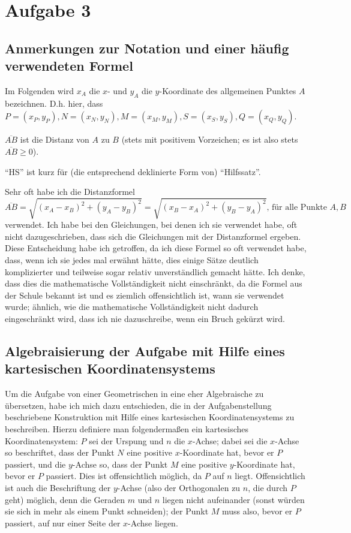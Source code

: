 \section{Aufgabe 3}

\subsection*{Anmerkungen zur Notation und einer häufig verwendeten Formel}

Im Folgenden wird $x_A$ die $x$- und $y_A$ die $y$-Koordinate des allgemeinen Punktes $A$ bezeichnen. D.h. hier, dass 
$P=(x_P, y_P), N=(x_N, y_N), M=(x_M, y_M), S=(x_S, y_S), Q=(x_Q, y_Q)$.

$\overline{AB}$ ist die Distanz von $A$ zu $B$ (stets mit positivem Vorzeichen; es ist also stets $\overline{AB}
\geq 0$).

"`HS"' ist kurz für (die entsprechend deklinierte Form von) "`Hilfssatz"'.

Sehr oft habe ich die Distanzformel 
\[\overline{AB}=\sqrt{(x_A-x_B)^2+(y_A-y_B)^2}=\sqrt{(x_B-x_A)^2+(y_B-y_A)^2}\text{, für alle Punkte $A,B$}\] 
verwendet. Ich habe bei den Gleichungen, bei denen ich sie verwendet habe, oft nicht dazugeschrieben, dass sich die 
Gleichungen mit der Distanzformel ergeben. Diese Entscheidung habe ich getroffen, da ich diese Formel so oft verwendet 
habe, dass, wenn ich sie jedes mal erwähnt hätte, dies einige Sätze deutlich komplizierter und teilweise sogar 
relativ unverständlich gemacht hätte. Ich denke, dass dies die mathematische Vollständigkeit nicht einschränkt, da 
die Formel aus der Schule bekannt ist und es ziemlich offensichtlich ist, wann sie verwendet wurde; ähnlich, wie 
die mathematische Vollständigkeit nicht dadurch eingeschränkt wird, dass ich nie dazuschreibe, wenn ein Bruch 
gekürzt wird.

\subsection*{Algebraisierung der Aufgabe mit Hilfe eines kartesischen Koordinatensystems}

Um die Aufgabe von einer Geometrischen in eine eher Algebraische zu übersetzen, habe ich mich dazu entschieden, die 
in der Aufgabenstellung beschriebene Konstruktion mit Hilfe eines kartesischen Koordinatensystems zu beschreiben. 
Hierzu definiere man folgendermaßen ein kartesisches Koordinatensystem: $P$ sei der Urspung und $n$ die $x$-Achse; 
dabei sei die $x$-Achse so beschriftet, dass der Punkt $N$ eine positive $x$-Koordinate hat, bevor er $P$ passiert, 
und die $y$-Achse so, dass der Punkt $M$ eine positive $y$-Koordinate hat, bevor er $P$ passiert. Dies ist 
offensichtlich möglich, da $P$ auf $n$ liegt. Offensichtlich ist auch die Beschriftung der $y$-Achse (also der 
Orthogonalen zu $n$, die durch $P$ geht) möglich, denn die Geraden $m$ und $n$ liegen nicht aufeinander (sonst 
würden sie sich in mehr als einem Punkt schneiden); der Punkt $M$ muss also, bevor er $P$ passiert, auf nur einer 
Seite der $x$-Achse liegen.

